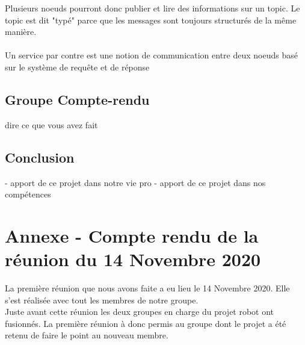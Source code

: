 \documentclass{PackagerQualityN}
\begin{document}
Plusieurs noeuds pourront donc publier et lire des informations sur un topic. Le topic est dit "typé" parce que les messages sont toujours structurés de la même manière.\\
\\
Un service par contre est une notion de communication entre deux noeuds basé sur le système de requête et de réponse


\subsection{Groupe Compte-rendu}
    dire ce que vous avez fait
\newp           

\subsection{Conclusion}

- apport de ce projet dans notre vie pro
- apport de ce projet dans nos compétences



\newp  

\appendix
\section{Annexe - Compte rendu de la réunion du 14 Novembre 2020}
La première réunion que nous avons faite a eu lieu le 14 Novembre 2020. Elle s'est réalisée avec tout les membres de notre groupe.
\\

Juste avant cette réunion les deux groupes en charge du projet robot ont fusionnés. La première réunion à donc permis au groupe dont le projet a été retenu de faire le point au nouveau membre. 
\\
\end{document}
